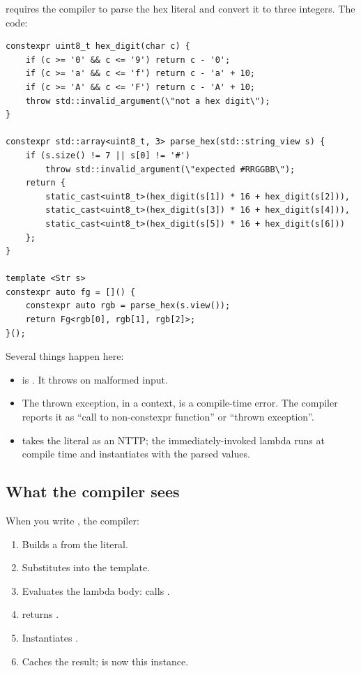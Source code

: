  requires the compiler to parse the hex
literal and convert it to three integers. The code:

\begin{lstlisting}
constexpr uint8_t hex_digit(char c) {
    if (c >= '0' && c <= '9') return c - '0';
    if (c >= 'a' && c <= 'f') return c - 'a' + 10;
    if (c >= 'A' && c <= 'F') return c - 'A' + 10;
    throw std::invalid_argument(\"not a hex digit\");
}

constexpr std::array<uint8_t, 3> parse_hex(std::string_view s) {
    if (s.size() != 7 || s[0] != '#')
        throw std::invalid_argument(\"expected #RRGGBB\");
    return {
        static_cast<uint8_t>(hex_digit(s[1]) * 16 + hex_digit(s[2])),
        static_cast<uint8_t>(hex_digit(s[3]) * 16 + hex_digit(s[4])),
        static_cast<uint8_t>(hex_digit(s[5]) * 16 + hex_digit(s[6]))
    };
}

template <Str s>
constexpr auto fg = []() {
    constexpr auto rgb = parse_hex(s.view());
    return Fg<rgb[0], rgb[1], rgb[2]>;
}();
\end{lstlisting}

Several things happen here:

\begin{itemize}[leftmargin=*]
  \item {} is . It throws on
    malformed input.
  \item The thrown exception, in a  context, is
    a compile-time error. The compiler reports it as
    ``call to non-constexpr function'' or ``thrown exception''.
  \item {} takes the literal as an NTTP;
    the immediately-invoked lambda runs at compile time and
    instantiates  with the parsed values.
\end{itemize}

\subsection*{What the compiler sees}

When you write , the compiler:

\begin{enumerate}[leftmargin=*]
  \item Builds a  from the literal.
  \item Substitutes into the template.
  \item Evaluates the lambda body: calls .
  \item {} returns \code{[255, 100, 50]}.
  \item Instantiates .
  \item Caches the result;  is now this
    instance.
\end{enumerate}

